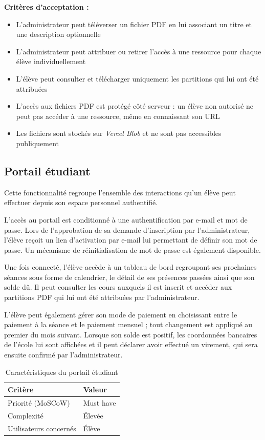 \documentclass{article}
\begin{document}
\textbf{Critères d'acceptation :}
\begin{itemize}
    \item L'administrateur peut téléverser un fichier PDF
    en lui associant un titre et une description optionnelle
    \item L'administrateur peut attribuer ou retirer l'accès
    à une ressource pour chaque élève individuellement
    \item L'élève peut consulter et télécharger uniquement
    les partitions qui lui ont été attribuées
    \item L'accès aux fichiers PDF est protégé côté serveur :
    un élève non autorisé ne peut pas accéder à une ressource,
    même en connaissant son URL
    \item Les fichiers sont stockés sur \textit{Vercel Blob}
    et ne sont pas accessibles publiquement
\end{itemize}

\subsection{Portail étudiant}

Cette fonctionnalité regroupe l'ensemble des interactions qu'un
élève peut effectuer depuis son espace personnel authentifié.

L'accès au portail est conditionné à une authentification par
e-mail et mot de passe. Lors de l'approbation de sa demande
d'inscription par l'administrateur, l'élève reçoit un lien
d'activation par e-mail lui permettant de définir son mot de passe.
Un mécanisme de réinitialisation de mot de passe est également
disponible.

Une fois connecté, l'élève accède à un tableau de bord regroupant
ses prochaines séances sous forme de calendrier, le détail de
ses présences passées ainsi que son solde dû. Il peut consulter
les cours auxquels il est inscrit et accéder aux partitions PDF
qui lui ont été attribuées par l'administrateur.

L'élève peut également gérer son mode de paiement en choisissant
entre le paiement à la séance et le paiement mensuel ; tout
changement est appliqué au premier du mois suivant. Lorsque son
solde est positif, les coordonnées bancaires de l'école lui sont
affichées et il peut déclarer avoir effectué un virement, qui sera
ensuite confirmé par l'administrateur.

\begin{table}[H]
\centering
\begin{tabular}{|p{5cm}|p{7cm}|}
\hline
\textbf{Critère} & \textbf{Valeur} \\
\hline
Priorité (MoSCoW) & Must have \\
\hline
Complexité & Élevée \\
\hline
Utilisateurs concernés & Élève \\
\hline
\end{tabular}
\caption{Caractéristiques du portail étudiant}
\end{table}
\end{document}
